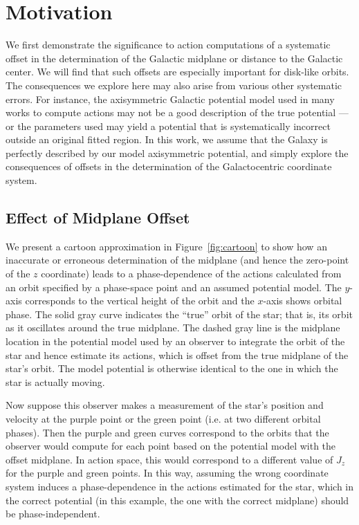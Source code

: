 \documentclass[twocolumn]{aastex62}
\begin{document}
\section{Motivation} \label{sec:ref_frame}
We first demonstrate the significance  to action computations of a systematic
offset in the determination of the Galactic midplane or distance to the
Galactic center. We will find that such offsets are especially important for
disk-like orbits. The consequences we explore here may also arise from various
other systematic errors. For instance, the axisymmetric Galactic potential
model used in many works to compute actions may not be a good description of
the true potential --- or the parameters used may yield a potential that is
systematically incorrect outside an original fitted region. In this work, we
assume that the Galaxy is perfectly described by our model axisymmetric
potential, and simply explore the consequences of offsets in the determination
of the Galactocentric coordinate system.

\subsection{Effect of Midplane Offset} \label{ssec:cartoon}
We present a cartoon approximation in Figure~\ref{fig:cartoon} to show how an
inaccurate or erroneous determination of the midplane (and hence the
zero-point of the $z$ coordinate) leads to a phase-dependence of the actions
calculated from an orbit specified by a phase-space point and an assumed
potential model. The $y$-axis corresponds to the vertical height of the orbit
and the $x$-axis shows orbital phase. The solid gray curve indicates the
``true'' orbit of the star; that is, its orbit as it oscillates around the
true midplane. The dashed gray line is the midplane location in the potential
model used by an observer to integrate the orbit of the star and hence estimate its actions,
which is offset from the true midplane of the star's orbit. The model
potential is otherwise identical to the one in which the star is actually
moving.

Now suppose this observer makes a measurement of the star's position and
velocity at the purple point or the green point (i.e. at two different orbital
phases). Then the purple and green curves correspond to the orbits that the
observer would compute for each point based on the potential model with the
offset midplane. In action space, this would correspond to a different value
of $J_z$ for the purple and green points. In this way, assuming the wrong
coordinate system induces a phase-dependence in the actions estimated for the
star, which in the correct potential (in this example, the one with the
correct midplane) should be phase-independent.
\end{document}
